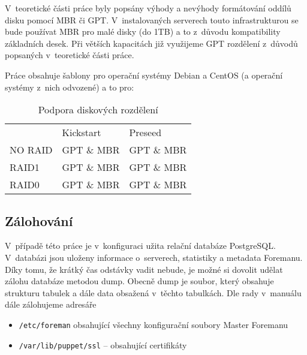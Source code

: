 V~teoretické části práce byly popsány výhody a nevýhody formátování oddílů disku pomocí MBR či GPT. V~instalovaných serverech touto infrastrukturou se bude používat MBR pro malé disky (do 1TB) a to z~důvodu kompatibility základních desek. Při větších kapacitách již využijeme GPT rozdělení z~důvodů popsaných v~teoretické části práce.

Práce obsahuje šablony pro operační systémy Debian a CentOS (a operační systémy z~nich odvozené) a to pro:
\begin{table}[]
\centering
\caption{Podpora diskových rozdělení}
\label{gptnmbr}
\begin{tabular}{lll}
        & Kickstart  & Preseed    \\
NO RAID & GPT \& MBR & GPT \& MBR \\
RAID1   & GPT \& MBR & GPT \& MBR \\
RAID0   & GPT \& MBR & GPT \& MBR
\end{tabular}
\end{table}


\subsection{Zálohování}

V~případě této práce je v~konfiguraci užita relační databáze PostgreSQL. V~databázi jsou uloženy  informace o~serverech, statistiky a metadata Foremanu. Díky tomu, že krátký čas odstávky vadit nebude, je možné si dovolit udělat zálohu databáze metodou dump. Obecně dump je soubor, který obsahuje strukturu tabulek a dále data obsažená v~těchto tabulkách. Dle rady v~manuálu \cite{foreman-backup} dále zálohujeme adresáře

\begin{itemize}
\item \texttt{/etc/foreman} obsahující všechny konfigurační soubory Master Foremanu
\item \texttt{/var/lib/puppet/ssl} -- obsahující certifikáty
\end{itemize}

